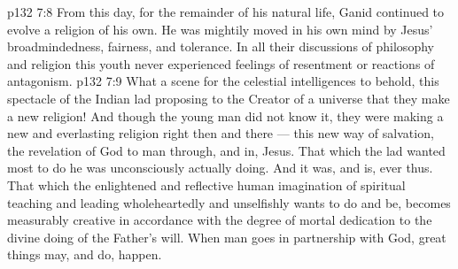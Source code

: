 \vs p132 7:8 From this day, for the remainder of his natural life, Ganid continued to evolve a religion of his own. He was mightily moved in his own mind by Jesus’ broadmindedness, fairness, and tolerance. In all their discussions of philosophy and religion this youth never experienced feelings of resentment or reactions of antagonism.
\vs p132 7:9 \pc What a scene for the celestial intelligences to behold, this spectacle of the Indian lad proposing to the Creator of a universe that they make a new religion! And though the young man did not know it, they were making a new and everlasting religion right then and there --- this new way of salvation, the revelation of God to man through, and in, Jesus. That which the lad wanted most to do he was unconsciously actually doing. And it was, and is, ever thus. That which the enlightened and reflective human imagination of spiritual teaching and leading wholeheartedly and unselfishly wants to do and be, becomes measurably creative in accordance with the degree of mortal dedication to the divine doing of the Father’s will. When man goes in partnership with God, great things may, and do, happen.
